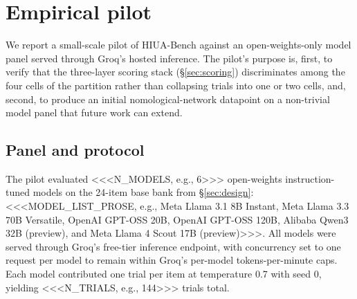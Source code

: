 %
%

\section{Empirical pilot}
\label{sec:pilot}

We report a small-scale pilot of HIUA-Bench against an open-weights-only model panel served through Groq's hosted inference. The pilot's purpose is, first, to verify that the three-layer scoring stack (\S\ref{sec:scoring}) discriminates among the four cells of the partition rather than collapsing trials into one or two cells, and, second, to produce an initial nomological-network datapoint on a non-trivial model panel that future work can extend.

\subsection{Panel and protocol}

The pilot evaluated <<<N_MODELS, e.g., 6>>> open-weights instruction-tuned models on the 24-item base bank from \S\ref{sec:design}: <<<MODEL_LIST_PROSE, e.g., Meta Llama 3.1 8B Instant, Meta Llama 3.3 70B Versatile, OpenAI GPT-OSS 20B, OpenAI GPT-OSS 120B, Alibaba Qwen3 32B (preview), and Meta Llama 4 Scout 17B (preview)>>>. All models were served through Groq's free-tier inference endpoint, with concurrency set to one request per model to remain within Groq's per-model tokens-per-minute caps. Each model contributed one trial per item at temperature 0.7 with seed 0, yielding <<<N_TRIALS, e.g., 144>>> trials total.

